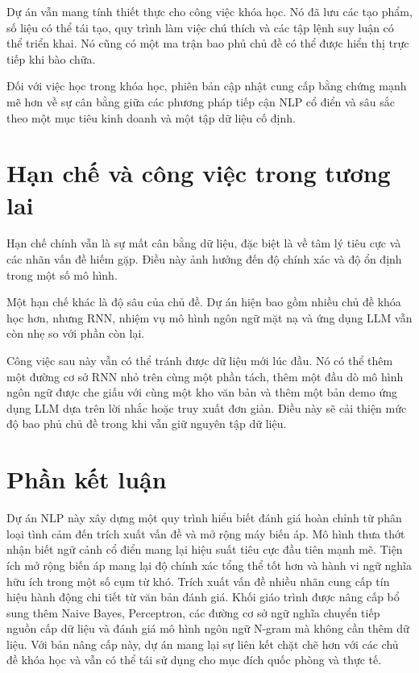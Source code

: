 \documentclass[12pt,a4paper]{article}
\begin{document}
Dự án vẫn mang tính thiết thực cho công việc khóa học. Nó đã lưu các tạo phẩm, số liệu có thể tái tạo, quy trình làm việc chú thích và các tập lệnh suy luận có thể triển khai. Nó cũng có một ma trận bao phủ chủ đề có thể được hiển thị trực tiếp khi bào chữa.

Đối với việc học trong khóa học, phiên bản cập nhật cung cấp bằng chứng mạnh mẽ hơn về sự cân bằng giữa các phương pháp tiếp cận NLP cổ điển và sâu sắc theo một mục tiêu kinh doanh và một tập dữ liệu cố định.

\section{Hạn chế và công việc trong tương lai}
Hạn chế chính vẫn là sự mất cân bằng dữ liệu, đặc biệt là về tâm lý tiêu cực và các nhãn vấn đề hiếm gặp. Điều này ảnh hưởng đến độ chính xác và độ ổn định trong một số mô hình.

Một hạn chế khác là độ sâu của chủ đề. Dự án hiện bao gồm nhiều chủ đề khóa học hơn, nhưng RNN, nhiệm vụ mô hình ngôn ngữ mặt nạ và ứng dụng LLM vẫn còn nhẹ so với phần còn lại.

Công việc sau này vẫn có thể tránh được dữ liệu mới lúc đầu. Nó có thể thêm một đường cơ sở RNN nhỏ trên cùng một phần tách, thêm một đầu dò mô hình ngôn ngữ được che giấu với cùng một kho văn bản và thêm một bản demo ứng dụng LLM dựa trên lời nhắc hoặc truy xuất đơn giản. Điều này sẽ cải thiện mức độ bao phủ chủ đề trong khi vẫn giữ nguyên tập dữ liệu.

\section{Phần kết luận}
Dự án NLP này xây dựng một quy trình hiểu biết đánh giá hoàn chỉnh từ phân loại tình cảm đến trích xuất vấn đề và mở rộng máy biến áp. Mô hình thưa thớt nhận biết ngữ cảnh cổ điển mang lại hiệu suất tiêu cực đầu tiên mạnh mẽ. Tiện ích mở rộng biến áp mang lại độ chính xác tổng thể tốt hơn và hành vi ngữ nghĩa hữu ích trong một số cụm từ khó. Trích xuất vấn đề nhiều nhãn cung cấp tín hiệu hành động chi tiết từ văn bản đánh giá. Khối giáo trình được nâng cấp bổ sung thêm Naive Bayes, Perceptron, các đường cơ sở ngữ nghĩa chuyển tiếp nguồn cấp dữ liệu và đánh giá mô hình ngôn ngữ N-gram mà không cần thêm dữ liệu. Với bản nâng cấp này, dự án mang lại sự liên kết chặt chẽ hơn với các chủ đề khóa học và vẫn có thể tái sử dụng cho mục đích quốc phòng và thực tế.

\clearpage
\end{document}

